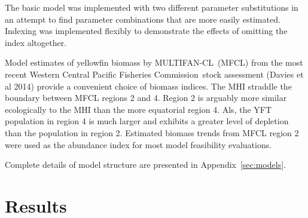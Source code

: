 \documentclass[12pt,letterpaper,twoside]{article}
\newcommand\MFCL{MULTIFAN-CL}
\newcommand\WCPFC{Western Central Pacific Fisheries Commission}
\begin{document}
The basic model was implemented with two different parameter
substitutions in an attempt to find parameter combinations that are
more easily estimated. Indexing was implemented flexibly to
demonstrate the effects of omitting the index altogether.

Model estimates of yellowfin biomass by \MFCL\ (MFCL)
from the most recent \WCPFC\ stock assessment (Davies et al 2014) provide
a convenient choice of biomass indices. The MHI straddle the
boundary between MFCL regions 2 and 4. Region 2 is arguably more similar
ecologically to the MHI than the more equatorial region 4. Als, the
YFT population
in region 4 is much larger and exhibits a greater level of depletion than the
population in region 2. Estimated biomass trends from MFCL region 2
were used as the abundance index for most model feasibility evaluations.

Complete details of model structure are presented in Appendix~\ref{sec:models}.



\section{Results}
\end{document}
